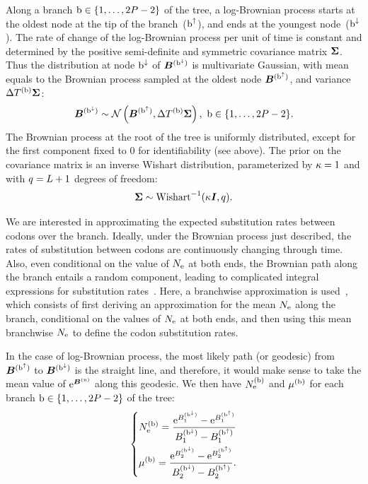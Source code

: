 \documentclass{article}
\begin{document}
Along a branch $\text{b} \in \{1, \hdots, 2 P - 2\}$ of the tree, a log-Brownian process starts at the oldest node at the tip of the branch~($\text{b}^{\uparrow}$), and ends at the youngest node~($\text{b}^{\downarrow}$).
The rate of change of the log-Brownian process per unit of time is constant and determined by the positive semi-definite and symmetric covariance matrix $\bm{\Sigma}$. Thus the distribution at node $\text{b}^{\downarrow}$ of $\bm{B}^{(\text{b}^{\downarrow})}$ is multivariate Gaussian, with mean equals to the Brownian process sampled at the oldest node $\bm{B}^{(\text{b}^{\uparrow})}$, and variance $\Delta T^{(\text{b})} \bm{\Sigma}$:
\begin{equation}
    \label{eq:DistribBrownian}
    \bm{B}^{(\text{b}^{\downarrow})} \sim \mathcal{N}\left(\bm{B}^{(\text{b}^{\uparrow})}, \Delta T^{(\text{b})} \bm{\Sigma} \right),\ \text{b} \in \{1, \hdots, 2 P - 2\}.
\end{equation}
The Brownian process at the root of the tree is uniformly distributed, except for the first component fixed to $0$ for identifiability (see above).
The {prior} on the covariance matrix is an inverse Wishart distribution, parameterized by $\kappa=1$ and with $q=L + 1$ degrees of freedom:
\begin{equation}
    \label{eq:Distribcovariance}
    \bm{\Sigma} \sim \text{Wishart}^{-1} (\kappa \bm{I}, q).
\end{equation}

We are interested in approximating the expected substitution rates between codons over the branch.
Ideally, under the Brownian process just described, the rates of substitution between codons are continuously changing through time.
Also, even conditional on the value of $N_{\text{e}}$ at both ends, the Brownian path along the branch entails a random component, leading to complicated integral expressions for substitution rates~\citep{Horvilleur2014}.
Here, a branchwise approximation is used~\citep{Lartillot2011}, which consists of first deriving an approximation for the mean $N_{\text{e}}$ along the branch, conditional on the values of $N_{\text{e}}$ at both ends, and then using this mean branchwise $N_{\text{e}}$ to define the codon substitution rates.

In the case of log-Brownian process, the most likely path (or geodesic) from $\bm{B}^{(\text{b}^{\uparrow})}$ to $\bm{B}^{(\text{b}^{\downarrow})}$ is the straight line, and therefore, it would make sense to take the mean value of $\text{e}^{\bm{B}^{(\text{n})}}$ along this geodesic.
We then have $N_{\text{e}}^{(\text{b})}$ and $\mu^{(\text{b})}$ for each branch $\text{b} \in \{1, \hdots, 2 P - 2\}$ of the tree:
\begin{equation}
    \label{eq:branchNemu}
    \begin{dcases}
        N_{\text{e}}^{(\text{b})} = \dfrac{\text{e}^{B_{1}^{(\text{b}^{\downarrow})}} - \text{e}^{B_{1}^{(\text{b}^{\uparrow})}}}{B_{1}^{(\text{b}^{\downarrow})} - B_{1}^{(\text{b}^{\uparrow})}} \\
        \mu^{(\text{b})} = \dfrac{\text{e}^{B_{2}^{(\text{b}^{\downarrow})}} - \text{e}^{B_{2}^{(\text{b}^{\uparrow})}}}{B_{2}^{(\text{b}^{\downarrow})} - B_{2}^{(\text{b}^{\uparrow})}}.
    \end{dcases}
\end{equation}
\end{document}
